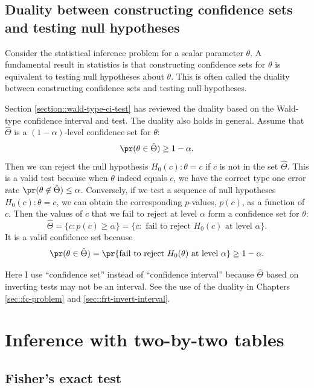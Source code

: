  
 
 \subsection{Duality between constructing confidence sets and testing null hypotheses}
 \label{section::duality-ci-testing}

Consider the statistical inference problem for a scalar parameter $\theta$. A fundamental result in statistics is that constructing confidence sets for $\theta$ is equivalent to testing null hypotheses about $\theta$. This is often called the duality between constructing confidence sets and testing null hypotheses. 

Section \ref{section::wald-type-ci-test} has reviewed the duality based on the  Wald-type confidence interval and test. The duality also holds in general. Assume that $\hat\Theta$ is a $(1-\alpha)$-level confidence set for $\theta$:
$$
\pr(  \theta \in \hat\Theta  ) \geq  1-\alpha.
$$
Then we can reject the null hypothesis $H_0(c): \theta = c$ if $c$ is not in the set $\hat\Theta$. This is a valid test because when $\theta$ indeed equals $c$, we have the correct type one error rate $\pr(  \theta \not  \in \hat\Theta ) \leq  \alpha$. 
Conversely, if we test a sequence of null hypotheses $H_0(c): \theta = c$, we can obtain the corresponding $p$-values, $p(c)$, as a function of $c$. Then the values of $c$ that we fail to reject at level $\alpha$ form a confidence set for $\theta$:
$$
 \hat\Theta = 
\{  c:  p(c) \geq \alpha \} = \{  c: \text{ fail to reject } H_0(c) \text{ at level } \alpha \} . 
$$
It is a valid confidence set because 
$$
\pr( \theta \in  \hat\Theta ) = 
\pr\{  \text{fail to reject } H_0(\theta) \text{ at level } \alpha \} \geq   1-\alpha.
$$


Here I use ``confidence set'' instead of ``confidence interval'' because $ \hat\Theta$ based on inverting tests may not be an interval. 
See the use of the duality in Chapters \ref{sec::fc-problem} and \ref{sec::frt-invert-interval}. 



\section{Inference with two-by-two tables}



\subsection{Fisher's exact test}
\label{sec::fisher-exact-test}

